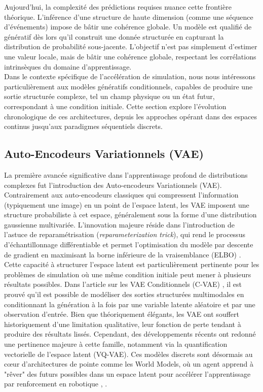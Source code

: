 Aujourd'hui, la complexité des prédictions requises nuance cette frontière théorique. L'inférence d'une structure de haute dimension (comme une séquence d'événements) impose de bâtir une cohérence globale. Un modèle est qualifié de génératif dès lors qu'il construit une donnée structurée en capturant la distribution de probabilité sous-jacente. L'objectif n'est pas simplement d'estimer une valeur locale, mais de bâtir une cohérence globale, respectant les corrélations intrinsèques du domaine d'apprentissage.\\

Dans le contexte spécifique de l'accélération de simulation, nous nous intéressons particulièrement aux modèles génératifs conditionnels, capables de produire une sortie structurée complexe, tel un champ physique ou un état futur, correspondant à une condition initiale. Cette section explore l'évolution chronologique de ces architectures, depuis les approches opérant dans des espaces continus jusqu'aux paradigmes séquentiels discrets.

\subsection{Auto-Encodeurs Variationnels (VAE)}

La première avancée significative dans l'apprentissage profond de distributions complexes fut l'introduction des Auto-encodeurs Variationnels (VAE). Contrairement aux auto-encodeurs classiques qui compressent l'information (typiquement une image) en un point de l'espace latent, les VAE imposent une structure probabiliste à cet espace, généralement sous la forme d'une distribution gaussienne multivariée. L'innovation majeure réside dans l'introduction de l'astuce de reparamétrisation (\textit{reparameterization trick}), qui rend le processus d'échantillonnage différentiable et permet l'optimisation du modèle par descente de gradient en maximisant la borne inférieure de la vraisemblance (ELBO) \cite{kingma_auto-encoding_2013}.
Cette capacité à structurer l'espace latent est particulièrement pertinente pour les problèmes de simulation où une même condition initiale peut mener à plusieurs résultats possibles. Dans l'article sur les VAE Conditionnels (C-VAE) \cite{sohn_learning_2015}, il est prouvé qu'il est possible de modéliser des sorties structurées multimodales en conditionnant la génération à la fois par une variable latente aléatoire et par une observation d'entrée. Bien que théoriquement élégants, les VAE ont souffert historiquement d'une limitation qualitative, leur fonction de perte tendant à produire des résultats lissés. Cependant, des développements récents ont redonné une pertinence majeure à cette famille, notamment via la quantification vectorielle de l'espace latent (VQ-VAE). Ces modèles discrets sont désormais au cœur d'architectures de pointe comme les World Models, où un agent apprend à "rêver" des futurs possibles dans un espace latent pour accélérer l'apprentissage par renforcement en robotique \cite{razavi_generating_2019}, \cite{ha_world_2018}.


